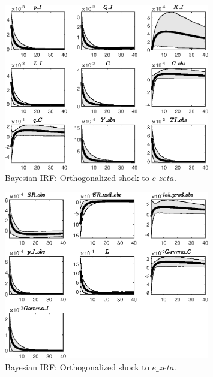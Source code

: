 \begin{figure}[H]
\centering 
\includegraphics[width=0.80\textwidth]{directed_search/Output/directed_search_Bayesian_IRF_e_zeta_1}
\caption{Bayesian IRF: Orthogonalized shock to $e\_zeta$.}
\label{Fig:BayesianIRF:e_zeta:1}
\end{figure}
 
\begin{figure}[H]
\centering 
\includegraphics[width=0.80\textwidth]{directed_search/Output/directed_search_Bayesian_IRF_e_zeta_2}
\caption{Bayesian IRF: Orthogonalized shock to $e\_zeta$.}
\label{Fig:BayesianIRF:e_zeta:2}
\end{figure}
 
